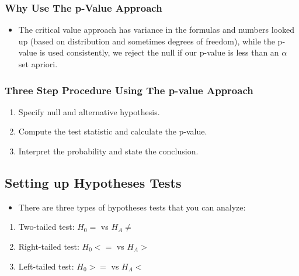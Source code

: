 \documentclass[
  letterpaper,
  DIV=11,
  numbers=noendperiod]{scrreprt}
\providecommand{\tightlist}{%
  \setlength{\itemsep}{0pt}\setlength{\parskip}{0pt}}\usepackage{longtable,booktabs,array}
\begin{document}
\subsubsection{Why Use The p-Value
Approach}\label{why-use-the-p-value-approach}

\begin{itemize}
\tightlist
\item
  The critical value approach has variance in the formulas and numbers
  looked up (based on distribution and sometimes degrees of freedom),
  while the p-value is used consistently, we reject the null if our
  p-value is less than an \(\alpha\) set apriori.
\end{itemize}

\subsubsection{Three Step Procedure Using The p-value
Approach}\label{three-step-procedure-using-the-p-value-approach}

\begin{enumerate}
\def\labelenumi{\arabic{enumi}.}
\tightlist
\item
  Specify null and alternative hypothesis.
\item
  Compute the test statistic and calculate the p-value.\\
\item
  Interpret the probability and state the conclusion.
\end{enumerate}

\subsection{Setting up Hypotheses
Tests}\label{setting-up-hypotheses-tests}

\begin{itemize}
\tightlist
\item
  There are three types of hypotheses tests that you can analyze:
\end{itemize}

\begin{enumerate}
\def\labelenumi{\arabic{enumi}.}
\tightlist
\item
  Two-tailed test: \(H_0 =\) vs \(H_A \neq\)
\item
  Right-tailed test: \(H_0 <=\) vs \(H_A >\)
\item
  Left-tailed test: \(H_0 >=\) vs \(H_A <\)
\end{enumerate}
\end{document}
